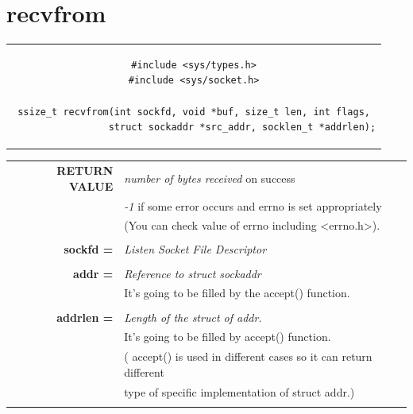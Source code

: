 \section{recvfrom}
\begin{center}
\begin{tabular}{c}
\begin{lstlisting}[linewidth=340pt, basicstyle=\footnotesize\sffamily,]
#include <sys/types.h>
#include <sys/socket.h>

ssize_t recvfrom(int sockfd, void *buf, size_t len, int flags,
                 struct sockaddr *src_addr, socklen_t *addrlen);
\end{lstlisting}
\end{tabular}
\end{center}
\begin{table}[h]
\centering\footnotesize
\begin{tabular}{rl}
\textbf{RETURN VALUE} & {\textit{number of bytes received} on success}\\
{} & {\textit{-1} if some error occurs and errno is set appropriately}\\
{} & {(You can check value of errno including <errno.h>).}\\
& \\
\textbf{sockfd =} & {\textit{Listen Socket File Descriptor}}\\
&\\
\textbf{addr =} & {\textit{Reference to struct sockaddr}}\\
{} & {It's going to be filled by the accept() function.}\\
& \\
\textbf{addrlen =} & {\textit{Length of the struct of addr.}}\\
{} & {It's going to be filled by accept() function.}\\
{} & {( accept() is used in different cases so it can return different}\\
{} & {type of specific implementation of struct addr.)}\\
&\\
\end{tabular}
\end{table}

